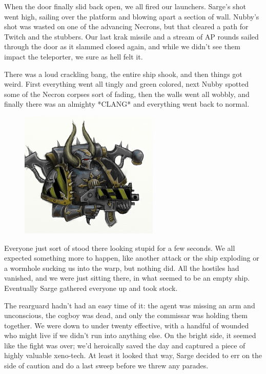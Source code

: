 When the door finally slid back open, we all fired our launchers. 
Sarge’s shot went high, sailing over the platform and blowing apart a section of wall. 
Nubby’s shot was wasted on one of the advancing Necrons, but that cleared a path for Twitch and the stubbers. 
Our last krak missile and a stream of AP rounds sailed through the door as it slammed closed again, and while we didn’t see them impact the teleporter, we sure as hell felt it.

There was a loud crackling bang, the entire ship shook, and then things got weird. 
First everything went all tingly and green colored, next Nubby spotted some of the Necron corpses sort of fading, then the walls went all wobbly, and finally there was an almighty *CLANG* and everything went back to normal.

\begin{figure}
	\begin{center}
		\includegraphics[width=\figwidth]{pics/8/50.png}
	\end{center}
\end{figure}
Everyone just sort of stood there looking stupid for a few seconds. 
We all expected something more to happen, like another attack or the ship exploding or a wormhole sucking us into the warp, but nothing did. 
All the hostiles had vanished, and we were just sitting there, in what seemed to be an empty ship. 
Eventually Sarge gathered everyone up and took stock.

The rearguard hadn’t had an easy time of it: 
the agent was missing an arm and unconscious, the cogboy was dead, and only the commissar was holding them together. 
We were down to under twenty effective, with a handful of wounded who might live if we didn’t run into anything else. 
On the bright side, it seemed like the fight was over; 
we’d heroically saved the day and captured a piece of highly valuable xeno-tech. 
At least it looked that way, Sarge decided to err on the side of caution and do a last sweep before we threw any parades.

